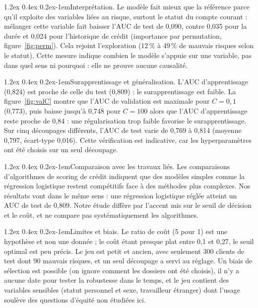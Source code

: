 \documentclass[11pt,a4paper]{article}
\makeatletter
\renewcommand\paragraph{\@startsection{paragraph}{4}{\z@}%
  {1.2ex \@plus 0.4ex \@minus 0.2ex}{-1em}{\normalfont\normalsize\bfseries}}
\makeatother
\begin{document}
\paragraph{Interprétation.} Le modèle fait mieux que la référence parce qu'il exploite des variables liées au risque, surtout le statut du compte courant : mélanger cette variable fait baisser l'AUC de test de 0,090, contre 0,035 pour la durée et 0,024 pour l'historique de crédit (importance par permutation, figure~\ref{fig:perm}). Cela rejoint l'exploration (12\,\% à 49\,\% de mauvais risques selon le statut). Cette mesure indique combien le modèle s'appuie sur une variable, pas dans quel sens ni pourquoi : elle ne prouve aucune causalité.

\paragraph{Surapprentissage et généralisation.} L'AUC d'apprentissage (0,824) est proche de celle du test (0,809) : le surapprentissage est faible. La figure~\ref{fig:valC} montre que l'AUC de validation est maximale pour $C = 0{,}1$ (0,773), puis baisse jusqu'à 0,748 pour $C = 100$ alors que l'AUC d'apprentissage reste proche de 0,84 : une régularisation trop faible favorise le surapprentissage. Sur cinq découpages différents, l'AUC de test varie de 0,769 à 0,814 (moyenne 0,797, écart-type 0,016). Cette vérification est indicative, car les hyperparamètres ont été choisis sur un seul découpage.

\paragraph{Comparaison avec les travaux liés.} Les comparaisons d'algorithmes de scoring de crédit \cite{lie1,lie2} indiquent que des modèles simples comme la régression logistique restent compétitifs face à des méthodes plus complexes. Nos résultats vont dans le même sens : une régression logistique réglée atteint un AUC de test de 0,809. Notre étude diffère par l'accent mis sur le seuil de décision et le coût, et ne compare pas systématiquement les algorithmes.

\paragraph{Limites et biais.} Le ratio de coût (5 pour 1) est une hypothèse et non une donnée ; le coût étant presque plat entre 0,1 et 0,27, le seuil optimal est peu précis. Le jeu est petit et ancien, avec seulement 300 clients de test dont 90 mauvais risques, et un seul découpage a servi au réglage. Un biais de sélection est possible (on ignore comment les dossiers ont été choisis), il n'y a aucune date pour tester la robustesse dans le temps, et le jeu contient des variables sensibles (statut personnel et sexe, travailleur étranger) dont l'usage soulève des questions d'équité non étudiées ici.
\end{document}
